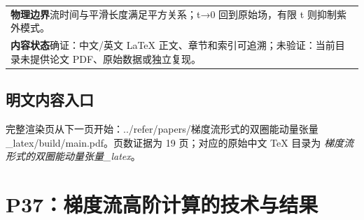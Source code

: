 \documentclass[UTF8,11pt,oneside]{ctexbook}
\begin{document}
\begin{table}[htbp]
\begin{tabular}{@{}p{}@{}}
    \textbf{物理边界}\quad 流时间与平滑长度满足平方关系；t→0 回到原始场，有限 t 则抑制紫外模式。 \\
    \textbf{内容状态}\quad 确证：中文/英文 LaTeX 正文、章节和索引可追溯；未验证：当前目录未提供论文 PDF、原始数据或独立复现。 \\
    \bottomrule
  \end{tabular}
\end{table}
\section*{明文内容入口}
\noindent 完整渲染页从下一页开始：../\allowbreak{}refer/\allowbreak{}papers/\allowbreak{}梯度流形式的双圈能动量张量\_\allowbreak{}latex/\allowbreak{}build/\allowbreak{}main.pdf。页数证据为 19 页；对应的原始中文 TeX 目录为 \emph{梯度流形式的双圈能动量张量\_latex}。
\clearpage

\clearpage

\chapter{P37：梯度流高阶计算的技术与结果}
\end{document}
